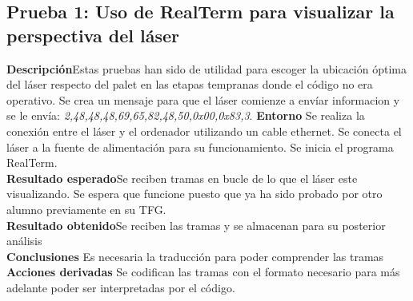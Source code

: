 \subsection{Prueba 1: Uso de RealTerm para visualizar la perspectiva del láser}
\textbf{Descripción}Estas pruebas han sido de utilidad para escoger la ubicación óptima del láser respecto del palet en las etapas tempranas donde el código no era operativo. Se crea un mensaje para que el láser comienze a envíar informacion y se le envía: \textit{2,48,48,48,69,65,82,48,50,0x00,0x83,3}.
\textbf{Entorno} Se realiza la conexión entre el láser y el ordenador utilizando un cable ethernet. Se conecta el láser a la fuente de alimentación para su funcionamiento. Se inicia el programa RealTerm. \\
\textbf{Resultado esperado}Se reciben tramas en bucle de lo que el láser este visualizando. Se espera que funcione puesto que ya ha sido probado por otro alumno previamente en su TFG.\\
\textbf{Resultado obtenido}Se reciben las tramas y se almacenan para su posterior análisis\\
\textbf{Conclusiones} Es necesaria la traducción para poder comprender las tramas\\
\textbf{Acciones derivadas}  Se codifican las tramas con el formato necesario para más adelante poder ser interpretadas por el código.\\

